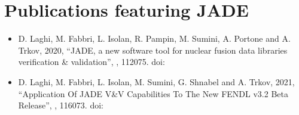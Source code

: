 \documentclass[letterpaper,10pt,english]{sphinxmanual}
\begin{document}
\section{Publications featuring JADE}
\label{\detokenize{publications:publications-featuring-jade}}\begin{itemize}
\item {} 
\sphinxAtStartPar
D. Laghi, M. Fabbri, L. Isolan, R. Pampin, M. Sumini, A. Portone and
A. Trkov, 2020,
“JADE, a new software tool for nuclear fusion data libraries verification \&
validation”, ,  112075.
doi: 

\item {} 
\sphinxAtStartPar
D. Laghi, M. Fabbri, L. Isolan, M. Sumini, G. Shnabel and A. Trkov, 2021,
“Application Of JADE V\&V Capabilities To The New FENDL v3.2 Beta Release”,
,  116073. doi: 

\end{itemize}
\end{document}
